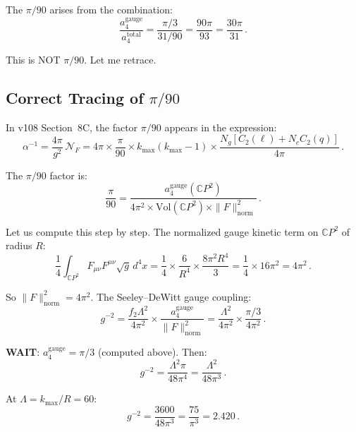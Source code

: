 \documentclass[11pt,a4paper]{article}
\newcommand{\CP}{\mathbb{C}P}
\begin{document}
The $\pi/90$ arises from the combination:
\begin{equation}
\frac{a_4^{\mathrm{gauge}}}{a_4^{\mathrm{total}}} = \frac{\pi/3}{31/90} = \frac{90\pi}{93} = \frac{30\pi}{31}\,.
\end{equation}

This is NOT $\pi/90$. Let me retrace.

\subsection{Correct Tracing of $\pi/90$}

In v108 Section~8C, the factor $\pi/90$ appears in the expression:
\begin{equation}
\alpha^{-1} = \frac{4\pi}{g^2}\,\mathcal{N}_F = 4\pi \times \frac{\pi}{90}\times k_{\max}(k_{\max}-1)\times\frac{N_g[C_2(\ell) + N_c C_2(q)]}{4\pi}\,.
\end{equation}

The $\pi/90$ factor is:
\begin{equation}
\frac{\pi}{90} = \frac{a_4^{\mathrm{gauge}}(\CP^2)}{4\pi^2 \times \mathrm{Vol}(\CP^2) \times \|F\|^2_{\mathrm{norm}}}\,.
\end{equation}

Let us compute this step by step. The normalized gauge kinetic term on $\CP^2$ of radius $R$:
\begin{equation}
\frac{1}{4}\int_{\CP^2} F_{\mu\nu}F^{\mu\nu}\sqrt{g}\,d^4x = \frac{1}{4}\times\frac{6}{R^4}\times\frac{8\pi^2R^4}{3} = \frac{1}{4}\times 16\pi^2 = 4\pi^2\,.
\end{equation}

So $\|F\|^2_{\mathrm{norm}} = 4\pi^2$. The Seeley--DeWitt gauge coupling:
\begin{equation}
g^{-2} = \frac{f_2\Lambda^2}{4\pi^2}\times\frac{a_4^{\mathrm{gauge}}}{\|F\|^2_{\mathrm{norm}}} = \frac{\Lambda^2}{4\pi^2}\times\frac{\pi/3}{4\pi^2}\,.
\end{equation}

\textbf{WAIT}: $a_4^{\mathrm{gauge}} = \pi/3$ (computed above). Then:
\begin{equation}
g^{-2} = \frac{\Lambda^2\pi}{48\pi^4} = \frac{\Lambda^2}{48\pi^3}\,.
\end{equation}

At $\Lambda = k_{\max}/R = 60$:
\begin{equation}
g^{-2} = \frac{3600}{48\pi^3} = \frac{75}{\pi^3} = 2.420\,.
\end{equation}
\end{document}
